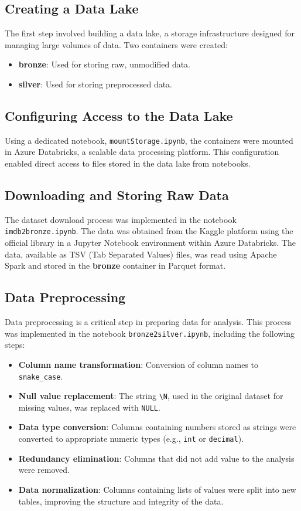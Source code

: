 \documentclass[a4paper,12pt]{article}
\begin{document}
\subsection{Creating a Data Lake}
The first step involved building a data lake, a storage infrastructure designed for managing large volumes of data. Two containers were created:
\begin{itemize}
    \item \textbf{bronze}: Used for storing raw, unmodified data.
    \item \textbf{silver}: Used for storing preprocessed data.
\end{itemize}

\subsection{Configuring Access to the Data Lake}

Using a dedicated notebook, \texttt{mountStorage.ipynb}, the containers were mounted in 
Azure Databricks, a scalable data processing platform. This configuration enabled direct 
access to files stored in the data lake from notebooks.

\subsection{Downloading and Storing Raw Data}

The dataset download process was implemented in the notebook \texttt{imdb2bronze.ipynb}. The data 
was obtained from the Kaggle platform using the official library in a Jupyter Notebook environment 
within Azure Databricks. The data, available as TSV (Tab Separated Values) files, was read using 
Apache Spark and stored in the \textbf{bronze} container in Parquet format.

\subsection{Data Preprocessing}

Data preprocessing is a critical step in preparing data for analysis. This process was 
implemented in the notebook \texttt{bronze2silver.ipynb}, including the following steps:

\begin{itemize}
    \item \textbf{Column name transformation}: Conversion of column names to \texttt{snake\_case}.
    \item \textbf{Null value replacement}: The string \texttt{\textbackslash N}, used in the original dataset for missing values, was replaced with \texttt{NULL}.
    \item \textbf{Data type conversion}: Columns containing numbers stored as strings were converted to appropriate numeric types (e.g., \texttt{int} or \texttt{decimal}).
    \item \textbf{Redundancy elimination}: Columns that did not add value to the analysis were removed.
    \item \textbf{Data normalization}: Columns containing lists of values were split into new tables, improving the structure and integrity of the data.
\end{itemize}
\end{document}
